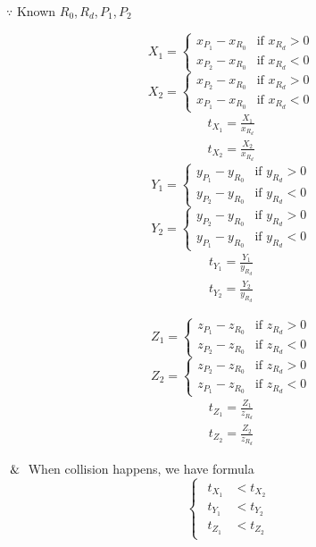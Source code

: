 $\because$ Known $R_0$,\,$R_d$,\,$P_1$,\,$P_2$
\begin{multicols}{2}
\noindent
\[
X_1 =
\begin{cases}
x_{P_1} - x_{R_0} & \text{if } x_{R_d} > 0 \\
x_{P_2} - x_{R_0} & \text{if } x_{R_d} < 0
\end{cases}
\]
\[
X_2 =
\begin{cases}
x_{P_2} - x_{R_0} & \text{if } x_{R_d} > 0 \\
x_{P_1} - x_{R_0} & \text{if } x_{R_d} < 0
\end{cases}
\]
\[
\begin{array}{lr}
t_{X_1} = \frac{X_1}{x_{R_d}} \\
t_{X_2} = \frac{X_2}{x_{R_d}}
\end{array}
\]
\columnbreak
\[
Y_1 =
\begin{cases}
y_{P_1} - y_{R_0} & \text{if } y_{R_d} > 0 \\
y_{P_2} - y_{R_0} & \text{if } y_{R_d} < 0
\end{cases}
\]
\[
Y_2 =
\begin{cases}
y_{P_2} - y_{R_0} & \text{if } y_{R_d} > 0 \\
y_{P_1} - y_{R_0} & \text{if } y_{R_d} < 0
\end{cases}
\]
\[
\begin{array}{lr}
t_{Y_1} = \frac{Y_1}{y_{R_d}} \\
t_{Y_2} = \frac{Y_2}{y_{R_d}}
\end{array}
\]
\end{multicols}
\begin{multicols}{2}
\noindent
\[
Z_1 =
\begin{cases}
z_{P_1} - z_{R_0} & \text{if } z_{R_d} > 0 \\
z_{P_2} - z_{R_0} & \text{if } z_{R_d} < 0
\end{cases}
\]
\[
Z_2 =
\begin{cases}
z_{P_2} - z_{R_0} & \text{if } z_{R_d} > 0 \\
z_{P_1} - z_{R_0} & \text{if } z_{R_d} < 0
\end{cases}
\]
\[
\begin{array}{lr}
t_{Z_1} = \frac{Z_1}{z_{R_d}} \\
t_{Z_2} = \frac{Z_2}{z_{R_d}}
\end{array}
\]
\columnbreak
\[
\]
\end{multicols}

$\And$ When collision happens,  we have formula
\[
\left\{
\begin{array}{lr}
\begin{aligned}
t_{X_1} &< t_{X_2} \\
t_{Y_1} &< t_{Y_2} \\
t_{Z_1} &< t_{Z_2}
\end{aligned}
\end{array}
\right.
\]

